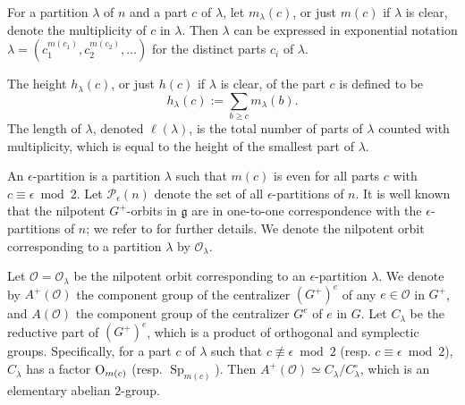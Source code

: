 \documentclass{amsart}
\theoremstyle{definition}
\DeclareMathOperator{\Sp}{Sp}
\newcommand{\cP}{\mathcal{P}}
\newcommand{\0}{\mathcal{O}}
\begin{document}
For a partition $\lambda$ of $n$ and a part $c$ of $\lambda$, let
$m_\lambda(c)$, or just $m(c)$ if $\lambda$ is clear,
denote the multiplicity of $c$ in $\lambda$.  Then $\lambda$ can be expressed in exponential notation
$\lambda = (c_1^{m(c_1)}, c_2^{m(c_2)}, \dots)$ for the distinct parts $c_i$ of $\lambda$.

The height $h_\lambda(c)$, or just $h(c)$ if $\lambda$ is clear, of the part $c$ is defined to be $$h_\lambda(c):=\sum_{b\geq c}m_\lambda(b).$$ 
The length of $\lambda$, denoted $\ell(\lambda)$, is the total number of parts of $\lambda$ counted with multiplicity, which is equal to the height of the smallest part of $\lambda$.

An $\epsilon$-partition is a partition $\lambda$ such that $m(c)$
is even for all parts $c$ with $c \equiv\epsilon\bmod 2$. 
Let $\cP_\epsilon(n)$ denote the set of all $\epsilon$-partitions of $n$. It is well known that the
nilpotent $G^+$-orbits in $\mathfrak g$ are in one-to-one
correspondence with the $\epsilon$-partitions of $n$; we refer to
\cite{C-M} for further details.
We denote the nilpotent orbit corresponding to a partition $\lambda$ by $\0_\lambda$.

Let $\0=\0_\lambda$ be the nilpotent orbit
corresponding to an $\epsilon$-partition $\lambda$. We denote by
$A^+(\0)$ the component group of the centralizer $(G^+)^e$ of any $e \in\0$ in $G^+$, and 
$A(\0)$ the component group of the centralizer $G^e$ of $e$ in $G$.
Let $C_\lambda$ be the reductive
part of $(G^+)^e$, which is a product of orthogonal and symplectic groups. 
Specifically, for a part $c$ of $\lambda$ such that $c \not\equiv \epsilon \bmod 2$ (resp. $c \equiv \epsilon\bmod 2$), 
$C_\lambda$ has a factor ${\rm O}_{m(c)}$ (resp. $\Sp_{m(c)}$).
Then $A^+(\0) \simeq C_\lambda/ C^\circ_\lambda$, which is an elementary abelian $2$-group.
\end{document}
